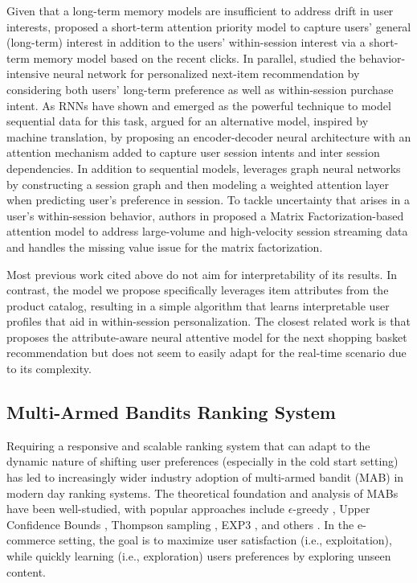 \documentclass[11pt, dvipdfmx]{article}
\begin{document}
Given that a long-term memory models are insufficient to address drift in user interests, \cite{KDD18_STAMP} proposed a short-term attention priority model to capture users' general (long-term) interest in addition to the users' within-session interest via a short-term memory model based on the recent clicks. In parallel, \cite{KDD18_JD_nextItemRecs} studied the behavior-intensive neural network for personalized next-item recommendation by considering both users' long-term preference as well as within-session purchase intent. As RNNs have shown and emerged as the powerful technique to model sequential data for this task, \cite{recsys17_userSesssionIntent} argued for an alternative model, inspired by machine translation, by proposing an encoder-decoder neural architecture with an attention mechanism added to capture user session intents and inter session dependencies. In addition to sequential models, \cite{CIKM19_sessionRec_graphNN} leverages graph neural networks by constructing a session graph and then modeling a weighted attention layer when predicting user's preference in session. To tackle uncertainty that arises in a user's within-session behavior, authors in \cite{KDD19_streaming_sessionRecs} proposed a Matrix Factorization-based attention model to address large-volume and high-velocity session streaming data and \cite{liu2019convolution} handles the missing value issue for the matrix factorization.

Most previous work cited above do not aim for interpretability of its results. In contrast, the model we propose specifically leverages item attributes from the product catalog, resulting in a simple algorithm that learns interpretable user profiles that aid in within-session personalization. The closest related work is \cite{sigir18_nextBucketRec} that proposes the attribute-aware neural attentive model for the next shopping basket recommendation but does not seem to easily adapt for the real-time scenario due to its complexity.   
\vspace{-0.2cm}
\subsection{Multi-Armed Bandits Ranking System}
Requiring a responsive and scalable ranking system that can adapt to the dynamic nature of shifting user preferences (especially in the cold start setting) has led to increasingly wider industry adoption of multi-armed bandit (MAB) in modern day ranking systems. The theoretical foundation and analysis of MABs  have been well-studied, with popular approaches include $\epsilon$-greedy \cite{sutton2018reinforcement}, Upper Confidence Bounds \cite{Auer2002FinitetimeAO}, Thompson sampling \cite{NIPS2011_TS}, EXP3 \cite{Auer2003EXP3}, and others \cite{sutton2018reinforcement}. In the e-commerce \cite{kdd20_sequentialRec} setting, the goal is to maximize user satisfaction (i.e., exploitation), while quickly learning (i.e., exploration) users preferences by exploring unseen content.
\end{document}
